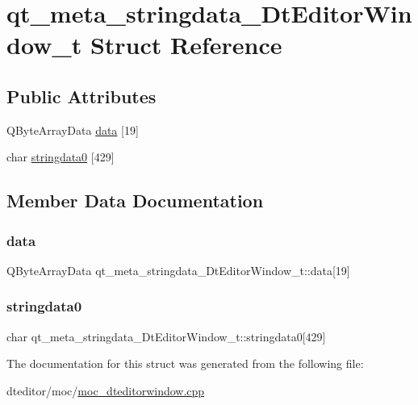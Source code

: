 \hypertarget{structqt__meta__stringdata___dt_editor_window__t}{}\section{qt\+\_\+meta\+\_\+stringdata\+\_\+\+Dt\+Editor\+Window\+\_\+t Struct Reference}
\label{structqt__meta__stringdata___dt_editor_window__t}
\subsection*{Public Attributes}
\begin{DoxyCompactItemize}
\item 
Q\+Byte\+Array\+Data \mbox{\hyperlink{structqt__meta__stringdata___dt_editor_window__t_a0371b33ddb19666a866f614f44e17163}{data}} \mbox{[}19\mbox{]}
\item 
char \mbox{\hyperlink{structqt__meta__stringdata___dt_editor_window__t_a9334210f761ae60554e3ddccbd6c07b3}{stringdata0}} \mbox{[}429\mbox{]}
\end{DoxyCompactItemize}


\subsection{Member Data Documentation}
\mbox{\label{structqt__meta__stringdata___dt_editor_window__t_a0371b33ddb19666a866f614f44e17163}} 
\subsubsection{\texorpdfstring{data}{data}}
{\footnotesize\ttfamily Q\+Byte\+Array\+Data qt\+\_\+meta\+\_\+stringdata\+\_\+\+Dt\+Editor\+Window\+\_\+t\+::data\mbox{[}19\mbox{]}}

\mbox{\label{structqt__meta__stringdata___dt_editor_window__t_a9334210f761ae60554e3ddccbd6c07b3}} 
\subsubsection{\texorpdfstring{stringdata0}{stringdata0}}
{\footnotesize\ttfamily char qt\+\_\+meta\+\_\+stringdata\+\_\+\+Dt\+Editor\+Window\+\_\+t\+::stringdata0\mbox{[}429\mbox{]}}



The documentation for this struct was generated from the following file\+:\begin{DoxyCompactItemize}
\item 
dteditor/moc/\mbox{\hyperlink{moc__dteditorwindow_8cpp}{moc\+\_\+dteditorwindow.\+cpp}}\end{DoxyCompactItemize}
